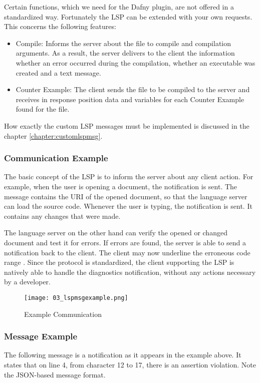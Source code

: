 Certain functions, which we need for the Dafny plugin,
are not offered in a standardized way.
Fortunately the LSP can be extended with your own requests. This concerns the following features:
\begin{itemize}
    \item Compile: Informs the server about the file to compile and compilation arguments.
          As a result, the server delivers to the client the information whether an error occurred during the compilation,
          whether an executable was created and a text message.
    \item Counter Example: The client sends the file to be compiled to the server and receives in
          response position data and variables for each Counter Example found for the file.
\end{itemize}

How exactly the custom LSP messages must be implemented is discussed in the chapter \ref{chapter:customlspmsg}.

\subsubsection{Communication Example}
The basic concept of the LSP is to inform the server about any client action.
For example, when the user is opening a document, the notification  is sent.
The message contains the URI of the opened document, so that the language server can load the source code.
Whenever the user is typing, the notification  is sent.
It contains any changes that were made.

The language server on the other hand can verify the opened or changed document and test it for errors.
If errors are found, the server is able to send a  notification back to the client.
The client may now underline the erroneous code range \cite{lspspec}.
Since the protocol is standardized, the client supporting the LSP is natively able to handle the diagnostics notification, without any actions necessary by a developer.

\begin{figure}[H]
    \centering
    \texttt{[image: 03\_lspmsgexample.png]}
    \caption{Example Communication}
    \label{fig:lspmsgexample}
\end{figure}

\subsubsection{Message Example}
The following message is a  notification as it appears in the example above.
It states that on line 4, from character 12 to 17, there is an assertion violation.
Note the JSON-based message format.


